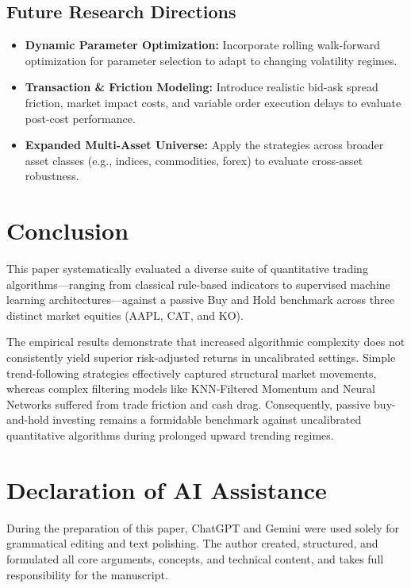 \documentclass{article}
\begin{document}
\subsection{Future Research Directions}
\begin{itemize}
    \item \textbf{Dynamic Parameter Optimization:} Incorporate rolling walk-forward optimization for parameter selection to adapt to changing volatility regimes.
    \item \textbf{Transaction \& Friction Modeling:} Introduce realistic bid-ask spread friction, market impact costs, and variable order execution delays to evaluate post-cost performance.
    \item \textbf{Expanded Multi-Asset Universe:} Apply the strategies across broader asset classes (e.g., indices, commodities, forex) to evaluate cross-asset robustness.
\end{itemize}

\newpage

\section{Conclusion}

This paper systematically evaluated a diverse suite of quantitative trading algorithms---ranging from classical rule-based indicators to supervised machine learning architectures---against a passive Buy and Hold benchmark across three distinct market equities (AAPL, CAT, and KO).

The empirical results demonstrate that increased algorithmic complexity does not consistently yield superior risk-adjusted returns in uncalibrated settings. Simple trend-following strategies effectively captured structural market movements, whereas complex filtering models like KNN-Filtered Momentum and Neural Networks suffered from trade friction and cash drag. Consequently, passive buy-and-hold investing remains a formidable benchmark against uncalibrated quantitative algorithms during prolonged upward trending regimes.

\newpage

\section{Declaration of AI Assistance}
During the preparation of this paper, ChatGPT and Gemini were used solely for grammatical editing and text polishing. The author created, structured, and formulated all core arguments, concepts, and technical content, and takes full responsibility for the manuscript.
\end{document}
